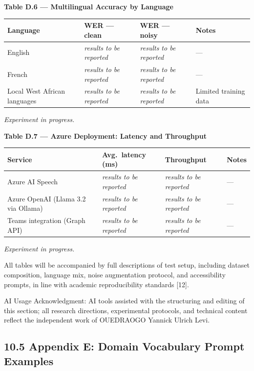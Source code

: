 \documentclass[12pt,a4paper]{article}
\begin{document}
\bigskip
\noindent\textbf{Table D.6 --- Multilingual Accuracy by Language}

\begin{center}
\begin{tabular}{|l|l|l|l|}
\hline
\textbf{Language} & \textbf{WER --- clean} & \textbf{WER --- noisy} & \textbf{Notes} \\
\hline
English & \textit{results to be reported} & \textit{results to be reported} & --- \\
French & \textit{results to be reported} & \textit{results to be reported} & --- \\
Local West African languages & \textit{results to be reported} & \textit{results to be reported} & Limited training data \\
\hline
\end{tabular}
\end{center}
\textit{Experiment in progress.}

\bigskip
\noindent\textbf{Table D.7 --- Azure Deployment: Latency and Throughput}

\begin{center}
\begin{tabular}{|l|l|l|l|}
\hline
\textbf{Service} & \textbf{Avg.\ latency (ms)} & \textbf{Throughput} & \textbf{Notes} \\
\hline
Azure AI Speech & \textit{results to be reported} & \textit{results to be reported} & --- \\
Azure OpenAI (Llama 3.2 via Ollama) & \textit{results to be reported} & \textit{results to be reported} & --- \\
Teams integration (Graph API) & \textit{results to be reported} & \textit{results to be reported} & --- \\
\hline
\end{tabular}
\end{center}
\textit{Experiment in progress.}

\bigskip
All tables will be accompanied by full descriptions of test setup, including dataset composition, language mix, noise augmentation protocol, and accessibility prompts, in line with academic reproducibility standards [12].


AI Usage Acknowledgment: AI tools assisted with the structuring and editing of this section; all research directions, experimental protocols, and technical content reflect the independent work of OUEDRAOGO Yannick Ulrich Levi.


\subsection{10.5 Appendix E: Domain Vocabulary Prompt Examples}
\end{document}
